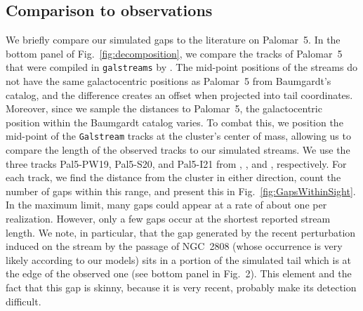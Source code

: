 \documentclass{aa}
\begin{document}
  \subsection{Comparison to observations}

    We briefly compare our simulated gaps to the literature on Palomar~5. In the bottom panel of Fig.~\ref{fig:decomposition}, we compare the tracks of Palomar~5 that were compiled in \texttt{galstreams} by \citet{2023MNRAS.520.5225M}. The mid-point positions of the streams do not have the same galactocentric positions as Palomar~5 from Baumgardt's catalog, and the difference creates an offset when projected into tail coordinates. Moreover, since we sample the distances to Palomar~5, the galactocentric position within the Baumgardt catalog varies. To combat this, we position the mid-point of the \texttt{Galstream} tracks at the cluster's center of mass, allowing us to compare the length of the observed tracks to our simulated streams. We use the three tracks Pal5-PW19, Pal5-S20, and Pal5-I21 from \citet{2019AJ....158..223P}, \citet{2020MNRAS.495.2222S}, and \citet{2021ApJ...914..123I}, respectively. For each track, we find the distance from the cluster in either direction, count the number of gaps within this range, and present this in Fig.~\ref{fig:GapsWithinSight}. In the maximum limit, many gaps could appear at a rate of about one per realization. However, only a few gaps occur at the shortest reported stream length. We note, in particular, that the gap generated by the recent perturbation induced on the stream by the passage of NGC~2808 (whose occurrence is very likely according to our models) sits in a portion of the simulated tail which is at the edge of the observed one (see bottom panel in Fig.~2). This element and the fact that this gap is skinny, because it is very recent, probably make its detection difficult. 
\end{document}
